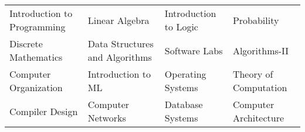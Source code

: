 
    


{\fontsize{10pt}{1.05em}
\selectfont
\begin{tabular}{l l l l}

Introduction to Programming &  Linear Algebra & Introduction to Logic & Probability\\
Discrete Mathematics & Data Structures and Algorithms & Software Labs & Algorithms-II\\
Computer Organization & Introduction to ML & Operating Systems & Theory of Computation\\
Compiler Design & Computer Networks & Database Systems & Computer Architecture\\

\end{tabular}
}\\

